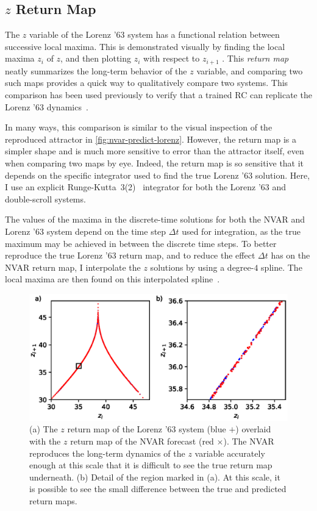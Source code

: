 \subsection{$z$ Return Map}

The $z$ variable of the Lorenz '63 system has a functional relation
between successive local maxima. This is demonstrated visually by
finding the local maxima $z_i$ of $z$, and then plotting $z_i$ with
respect to $z_{i+1}$ \cite{lorenz1963}. This \emph{return map} neatly
summarizes the long-term behavior of the $z$ variable, and comparing
two such maps provides a quick way to qualitatively compare two
systems. This comparison has been used previously to verify that a
trained RC can replicate the Lorenz '63 dynamics~\cite{pathak2017}.

In many ways, this comparison is similar to the visual inspection of the
reproduced attractor in \cref{fig:nvar-predict-lorenz}. However, the
return map is a simpler shape and is much more sensitive to error
than the attractor itself, even when comparing two maps by eye. Indeed,
the return map is so sensitive that it depends on the specific integrator
used to find the true Lorenz '63 solution. Here, I use an explicit
Runge-Kutta~3(2)~\cite{dormand1980} integrator for both the Lorenz '63
and double-scroll systems.

The values of the maxima in the discrete-time solutions for both the
NVAR and Lorenz '63 system depend on the time step $\Delta t$ used for
integration, as the true maximum may be achieved in between the
discrete time steps. To better reproduce the true Lorenz '63 return
map, and to reduce the effect $\Delta t$ has on the NVAR return map,
I interpolate the $z$ solutions by using a degree-$4$ spline. The
local maxima are then found on this interpolated spline~\cite{dierckx1995}.

\begin{figure}
  \includegraphics{figures/nvar-lorenz-rmap}
  \caption{(a) The $z$ return map of the Lorenz '63 system (blue $+$)
    overlaid with the $z$ return map of the NVAR forecast (red
    $\times$). The NVAR reproduces the long-term dynamics of the $z$
    variable accurately enough at this scale that it is difficult to
    see the true return map underneath. (b) Detail of the region
    marked in (a). At this scale, it is possible to see the small
    difference between the true and predicted return maps.}
  \label{fig:nvar-lorenz-rmap}
\end{figure}


